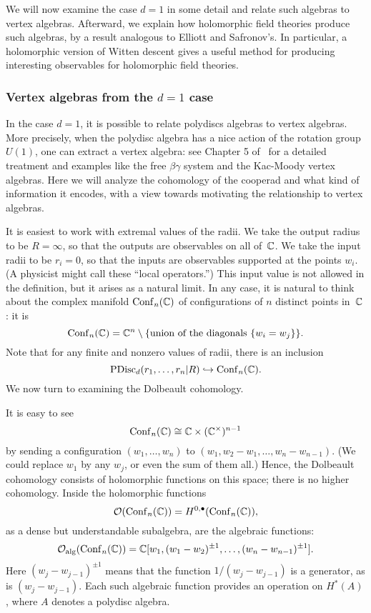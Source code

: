 \documentclass[11pt]{amsart}
\begin{document}
We will now examine the case $d=1$ in some detail and relate such algebras to vertex algebras.
Afterward, we explain how holomorphic field theories produce such algebras,
by a result analogous to Elliott and Safronov's.
In particular, a holomorphic version of Witten descent gives a useful method for producing interesting observables for holomorphic field theories.

\subsubsection{Vertex algebras from the $d=1$ case}

In the case $d=1$, it is possible to relate polydiscs algebras to vertex algebras.
More precisely, when the polydisc algebra has a nice action of the rotation group~$U(1)$,
one can extract a vertex algebra: 
see Chapter 5 of~\cite{CG1} for a detailed treatment and examples like the free $\beta\gamma$ system and the Kac-Moody vertex algebras.
Here we will analyze the cohomology of the cooperad and what kind of information it encodes, with a view towards motivating the relationship to vertex algebras.

It is easiest to work with extremal values of the radii.
We take the output radius to be $R = \infty$,
so that the outputs are observables on all of~$\mathbb C$.
We take the input radii to be $r_i = 0$,
so that the inputs are observables supported at the points $w_i$.
(A physicist might call these ``local operators.'')
This input value is not allowed in the definition, but it arises as a natural limit.
In any case, it is natural to think about the complex manifold ${\rm Conf}_n(\mathbb C)$ of configurations of $n$ distinct points in~$\mathbb C$:
it is
\[
{\rm Conf}_n(\mathbb C) = \mathbb C^n \setminus \{\text{union of the diagonals $\{ w_i = w_j\}$}\}.
\]
Note that for any finite and nonzero values of radii, there is an inclusion
\[
{\rm PDisc}_d(r_1, \ldots, r_n| R) \hookrightarrow {\rm Conf}_n(\mathbb C).
\]
We now turn to examining the Dolbeault cohomology.

It is easy to see
\[
{\rm Conf}_n(\mathbb C) \cong \mathbb C \times (\mathbb C^\times)^{n-1}
\]
by sending a configuration $(w_1,\ldots, w_n)$ to $(w_1, w_2 - w_1, \ldots, w_n-w_{n-1})$.
(We could replace $w_1$ by any $w_j$, or even the sum of them all.)
Hence, the Dolbeault cohomology consists of holomorphic functions on this space;
there is no higher cohomology.
Inside the holomorphic functions 
\[
\mathcal O({\rm Conf}_n(\mathbb C)) = H^{0,\bullet}({\rm Conf}_n(\mathbb C)),
\] 
as a dense but understandable subalgebra, are the algebraic functions:
\[
\mathcal O_{\rm alg}({\rm Conf}_n(\mathbb C)) = \mathbb C[w_1, (w_1 - w_2)^{\pm 1}, \ldots, (w_n - w_{n-1})^{\pm 1}].
\]
Here $(w_j - w_{j-1})^{\pm 1}$ means that the function $1/(w_j - w_{j-1})$ is a generator, 
as is $(w_j - w_{j-1})$.
Each such algebraic function provides an operation on $H^*(A)$, where $A$ denotes a polydisc algebra.
\end{document}

